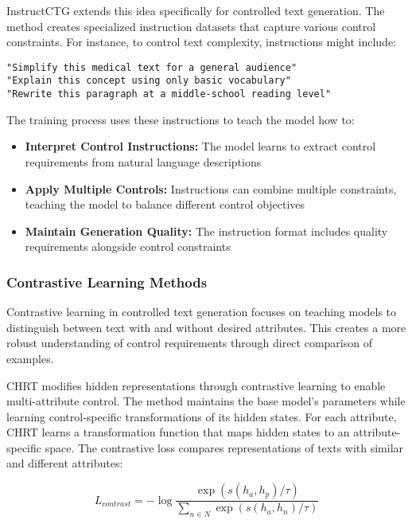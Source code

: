 InstructCTG extends this idea specifically for controlled text generation. The method creates specialized instruction datasets that capture various control constraints. For instance, to control text complexity, instructions might include:

\begin{verbatim}
"Simplify this medical text for a general audience"
"Explain this concept using only basic vocabulary"
"Rewrite this paragraph at a middle-school reading level"
\end{verbatim}

The training process uses these instructions to teach the model how to:
\begin{itemize}
   \item \textbf{Interpret Control Instructions:} The model learns to extract control requirements from natural language descriptions
   
   \item \textbf{Apply Multiple Controls:} Instructions can combine multiple constraints, teaching the model to balance different control objectives
   
   \item \textbf{Maintain Generation Quality:} The instruction format includes quality requirements alongside control constraints
\end{itemize}

\subsubsection{Contrastive Learning Methods}

Contrastive learning in controlled text generation focuses on teaching models to distinguish between text with and without desired attributes. This creates a more robust understanding of control requirements through direct comparison of examples.

CHRT modifies hidden representations through contrastive learning to enable multi-attribute control. The method maintains the base model's parameters while learning control-specific transformations of its hidden states. For each attribute, CHRT learns a transformation function that maps hidden states to an attribute-specific space. The contrastive loss compares representations of texts with similar and different attributes:

\begin{equation}
   L_{contrast} = -\log\frac{\exp(s(h_a, h_p)/\tau)}{\sum_{n \in N} \exp(s(h_a, h_n)/\tau)}
\end{equation}

